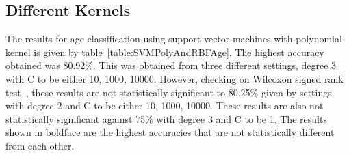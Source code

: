\documentclass[a4paper]{llncs}
\begin{document}
\subsection{Different Kernels}
The results for age classification using support vector machines with polynomial kernel is given by table~\ref{table:SVMPolyAndRBFAge}. The highest accuracy obtained was 80.92\%. This was obtained from three different settings, degree 3 with C to be either 10, 1000, 10000. However, checking on Wilcoxon signed rank test~\cite{wilcoxon1945individual}, these results are not statistically significant to 80.25\% given by settings with degree 2 and C to be either 10, 1000, 10000. These results are also not statistically significant against 75\% with degree 3 and C to be 1. The results shown in boldface are the highest accuracies that are not statistically different from each other. 
\end{document}
